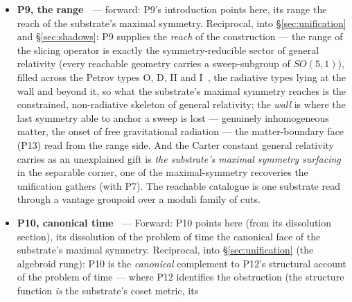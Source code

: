 \documentclass[11pt,a4paper]{article}
\theoremstyle{definition}
\begin{document}
\begin{itemize}
Reciprocal, into \S\ref{sec:real} and \S\ref{sec:shadows}: P8 supplies the
\emph{operator} that realizes the substrate's cuts --- the slicing curve
promoted from classifier to a generating operator for the whole static
spherically-symmetric sector, with two derivations at the heart of the core's
picture: \emph{straight cuts are vacuum} (the SdS family is exactly the kernel
of the matter functional) and \emph{matter is the bend of the cut}
($\rho=m'/4\pi r^2$, the curvature of the cut off the vacuum profile). The
covariance is lifted one level --- the de Sitter substrate held invariant
under change of \emph{geometry} as general relativity holds one geometry
invariant under change of chart, ``many geometries, one substrate'' --- the
operational form of \S\ref{sec:real}; the reading grounded on the results, not
entailed by them (P6).
\item \textbf{P9, the range~\cite{JanzenRange}} --- forward: P9's introduction points here, its range the reach of the
substrate's maximal symmetry. Reciprocal, into \S\ref{sec:unification} and
\S\ref{sec:shadows}: P9 supplies the \emph{reach} of the construction --- the
range of the slicing operator is exactly the symmetry-reducible sector of
general relativity (every reachable geometry carries a sweep-subgroup of
$SO(5,1)$), filled across the Petrov types O, D, II and I~\cite{Petrov1954}, the radiative types lying at the wall and beyond it, so what the substrate's maximal
symmetry reaches is the constrained, non-radiative skeleton of general
relativity; the \emph{wall} is where the last symmetry able to anchor a sweep is lost --- genuinely
inhomogeneous matter, the onset of free gravitational radiation --- the
matter-boundary face (P13) read from the range side. And the Carter constant
general relativity carries as an unexplained gift is \emph{the substrate's
maximal symmetry surfacing} in the separable corner, one of the
maximal-symmetry recoveries the unification gathers (with P7). The reachable
catalogue is one substrate read through a vantage groupoid over a moduli
family of cuts.
\item \textbf{P10, canonical time~\cite{JanzenCanonicalTime}} --- Forward: P10 points here (from its dissolution section),
its dissolution of the problem of time the canonical face of the substrate's
maximal symmetry. Reciprocal, into \S\ref{sec:unification} (the algebroid
rung): P10 is the \emph{canonical} complement to P12's structural account of
the problem of time --- where P12 identifies the obstruction (the
structure function \emph{is} the substrate's coset metric, its

\end{itemize}
\end{document}
